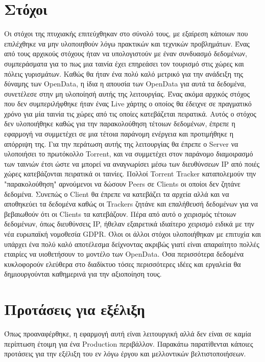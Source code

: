 \section{Στόχοι}
Οι στόχοι της πτυχιακής επιτεύχθηκαν στο σύνολό τους, 
με εξαίρεση κάποιων που επιλέχθηκε να μην υλοποιηθούν λόγω πρακτικών και τεχνικών προβλημάτων. Ένας από τους αρχικούς στόχους ήταν να υπολογιστούν με έναν συνδυασμό δεδομένων, συμπεράσματα για το πως μια ταινία έχει επηρεάσει τον τουρισμό στις χώρες και πόλεις γυρισμάτων. Καθώς θα ήταν ένα πολύ καλό μετρικό για την 
ανάδειξη της δύναμης των OpenData, η ίδια η απουσία των OpenData για αυτά τα δεδομένα, συνετέλεσε στην μη υλοποίησή αυτής της λειτουργίας. Ένας ακόμα αρχικός στόχος που δεν συμπεριλήφθηκε ήταν ένας Live χάρτης ο οποίος θα έδειχνε σε πραγματικό χρόνο για μία ταινία τις χώρες από τις οποίες κατεβάζεται πειρατικά. Αυτός ο στόχος δεν υλοποιήθηκε καθώς για την παρακολούθηση τέτοιων δεδομένων, έπρεπε η εφαρμογή να συμμετέχει σε μια τέτοια παράνομη ενέργεια και προτιμήθηκε η απόρριψη της. Για την περάτωση αυτής της λειτουργίας θα έπρεπε ο Server να υλοποιήσει το πρωτόκολλο Torrent, και να συμμετέχει στον παράνομο διαμοιρασμό των ταινιών έτσι ώστε να μπορεί να αναγνωρίσει μέσω των διευθύνσεων IP από ποιές χώρες κατεβάζονται πειρατικά οι ταινίες. Πολλοί Torrent Tracker καταπολεμούν την "παρακολούθηση" αρνούμενοι να δώσουν Peers σε Clients οι οποίοι δεν ζητάνε δεδομένα. Συνεπώς ο Client θα έπρεπε να κατεβάζει τα αρχεία αλλά και να αποθηκεύει τα δεδομένα καθώς οι Trackers ζητάνε και επαλήθευσή δεδομένων για να βεβαιωθούν ότι οι Clients τα κατεβάζουν. Πέρα από αυτό ο χειρισμός τέτοιων δεδομένων, όπως διευθύνσεις IP, ήθελαν εξαιρετικά ιδιαίτερο χειρισμό ειδικά με την νέα ευρωπαϊκή νομοθεσία GDPR.
Όλοι οι άλλοι στόχοι υλοποιήθηκαν με επιτυχία και υπάρχει ένα πολύ καλό αποτέλεσμα δείχνοντας ακριβώς γιατί είναι απαραίτητο πολλές εταιρίες να υιοθετήσουν το μοντέλο των OpenData. Όσα περισσότερα δεδομένα κυκλοφορούν ελεύθερα στο διαδίκτυο τόσες περισσότερες ιδέες και εργαλεία θα δημιουργούνται καθημερινά για την αξιοποίηση τους.

\section{Προτάσεις για εξέλιξη}
Όπως προαναφέρθηκε, η εφαρμογή αυτή είναι λειτουργική αλλά δεν είναι σε καμία περίπτωση έτοιμη για ένα Production περιβάλλον. Παρακάτω παρατίθενται κάποιες προτάσεις για την εξέλιξη του εν λόγω έργου και μελλοντικών βελτιστοποιήσεων. 

